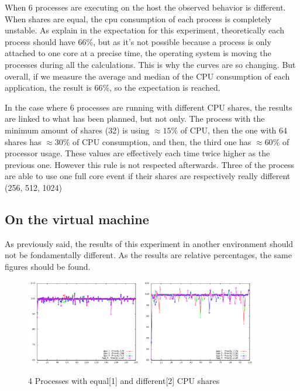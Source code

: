 When 6 processes are executing on the host the observed behavior is different.
When shares are equal, the cpu consumption of each process is completely
unstable.  As explain in the expectation for this experiment, theoretically
each process should have 66\%, but as it's not possible because a process is
only attached to one core at a precise time, the operating system is moving the
processes during all the calculations. This is why the curves are so changing.
But overall, if we measure the average and median of the CPU consumption of
each application, the result is 66\%, so the expectation is reached.

In the case where 6 processes are running with different CPU shares, the
results are linked to what has been planned, but not only. The process with the
minimum amount of shares (32) is using $\approx15\%$ of CPU, then the one with
64 shares has $\approx30\%$ of CPU consumption, and then, the third one has
$\approx60\%$ of processor usage. These values are effectively each time twice
higher as the previous one. However this rule is not respected afterwards. Three
of the process are able to use one full core event if their shares are respectively
really different (256, 512, 1024)

\subsection{On the virtual machine}

As previously said, the results of this experiment in another environment should
not be fondamentally different. As the results are relative percentages, the
same figures should be found.

\begin{figure}[h!]
\begin{center}
	\includegraphics[width=0.45\textwidth]{./Images/CpuMonitor/vm/4_equalshares.png}
	\includegraphics[width=0.45\textwidth]{./Images/CpuMonitor/vm/4_differentshares.png}
	\caption{4 Processes with equal[1] and different[2] CPU shares}
\end{center}
\end{figure}

